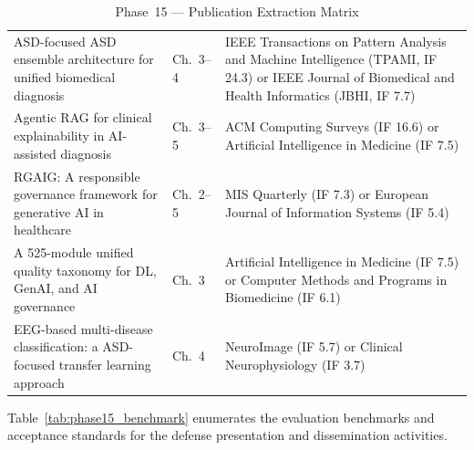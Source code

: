 \begingroup\singlespacing\tablefontsize\tablestripes
\begin{xltabular}{\textwidth}{@{} X l X @{}}
\caption{Phase~15 --- Publication Extraction Matrix}
\label{tab:phase15_publications}\\
\toprule
{} &  &  \\
\midrule
\endfirsthead
\endhead
\bottomrule
\endlastfoot
ASD-focused ASD ensemble architecture for unified biomedical diagnosis                           & Ch.~3--4 & IEEE Transactions on Pattern Analysis and Machine Intelligence (TPAMI, IF 24.3) or IEEE Journal of Biomedical and Health Informatics (JBHI, IF 7.7) \\
\addlinespace
Agentic RAG for clinical explainability in AI-assisted diagnosis                          & Ch.~3--5 & ACM Computing Surveys (IF 16.6) or Artificial Intelligence in Medicine (IF 7.5) \\
\addlinespace
RGAIG: A responsible governance framework for generative AI in healthcare                 & Ch.~2--5 & MIS Quarterly (IF 7.3) or European Journal of Information Systems (IF 5.4) \\
\addlinespace
A 525-module unified quality taxonomy for DL, GenAI, and AI governance                    & Ch.~3    & Artificial Intelligence in Medicine (IF 7.5) or Computer Methods and Programs in Biomedicine (IF 6.1) \\
\addlinespace
EEG-based multi-disease classification: a ASD-focused transfer learning approach         & Ch.~4    & NeuroImage (IF 5.7) or Clinical Neurophysiology (IF 3.7) \\
\end{xltabular}
\endgroup

\vspace{1.5em}

Table~\ref{tab:phase15_benchmark} enumerates the evaluation benchmarks and acceptance standards for the defense presentation and dissemination activities.

